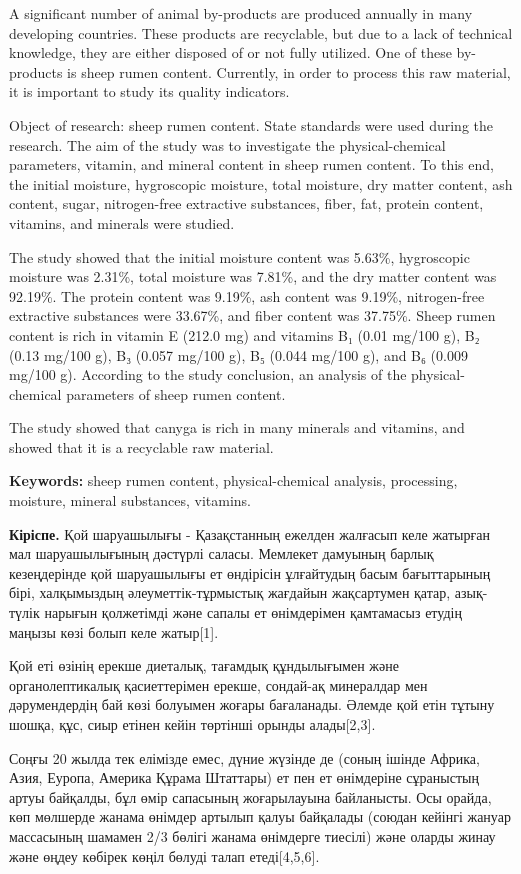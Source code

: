 A significant number of animal by-products are produced annually in many
developing countries. These products are recyclable, but due to a lack
of technical knowledge, they are either disposed of or not fully
utilized. One of these by-products is sheep rumen content. Currently, in
order to process this raw material, it is important to study its quality
indicators.

Object of research: sheep rumen content. State standards were used
during the research. The aim of the study was to investigate the
physical-chemical parameters, vitamin, and mineral content in sheep
rumen content. To this end, the initial moisture, hygroscopic moisture,
total moisture, dry matter content, ash content, sugar, nitrogen-free
extractive substances, fiber, fat, protein content, vitamins, and
minerals were studied.

The study showed that the initial moisture content was 5.63\%,
hygroscopic moisture was 2.31\%, total moisture was 7.81\%, and the dry
matter content was 92.19\%. The protein content was 9.19\%, ash content
was 9.19\%, nitrogen-free extractive substances were 33.67\%, and fiber
content was 37.75\%. Sheep rumen content is rich in vitamin E (212.0 mg)
and vitamins B₁ (0.01 mg/100 g), B₂ (0.13 mg/100 g), B₃ (0.057 mg/100
g), B₅ (0.044 mg/100 g), and B₆ (0.009 mg/100 g). According to the study
conclusion, an analysis of the physical-chemical parameters of sheep
rumen content.

The study showed that canyga is rich in many minerals and vitamins, and
showed that it is a recyclable raw material.

{\bfseries Keywords:} sheep rumen content, physical-chemical analysis,
processing, moisture, mineral substances, vitamins.

{\bfseries Кіріспе.} Қой шаруашылығы - Қазақстанның ежелден жалғасып келе
жатырған мал шаруашылығының дәстүрлі саласы. Мемлекет дамуының барлық
кезеңдерінде қой шаруашылығы ет өндірісін ұлғайтудың басым бағыттарының
бірі, халқымыздың әлеуметтік-тұрмыстық жағдайын жақсартумен қатар,
азық-түлік нарығын қолжетімді және сапалы ет өнімдерімен қамтамасыз
етудің маңызы көзі болып келе жатыр{[}1{]}.

Қой еті өзінің ерекше диеталық, тағамдық құндылығымен және
органолептикалық қасиеттерімен ерекше, сондай-ақ минералдар мен
дәрумендердің бай көзі болуымен жоғары бағаланады. Әлемде қой етін
тұтыну шошқа, құс, сиыр етінен кейін төртінші орынды алады{[}2,3{]}.

Соңғы 20 жылда тек елімізде емес, дүние жүзінде де (соның ішінде Африка,
Азия, Еуропа, Америка Құрама Штаттары) ет пен ет өнімдеріне сұраныстың
артуы байқалды, бұл өмір сапасының жоғарылауына байланысты. Осы орайда,
көп мөлшерде жанама өнімдер артылып қалуы байқалады (союдан кейінгі
жануар массасының шамамен 2/3 бөлігі жанама өнімдерге тиесілі) және
оларды жинау және өңдеу көбірек көңіл бөлуді талап етеді{[}4,5,6{]}.

